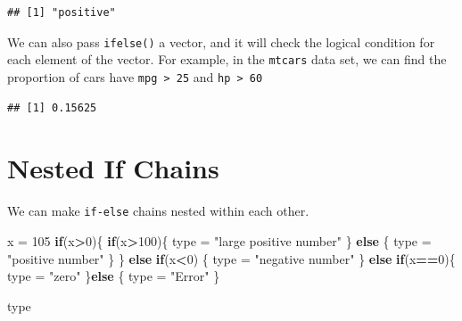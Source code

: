 \documentclass[
]{book}
\newenvironment{Shaded}{\begin{snugshade}}{\end{snugshade}}
\newcommand{\ControlFlowTok}[1]{\textcolor[rgb]{0.13,0.29,0.53}{\textbf{#1}}}
\newcommand{\DecValTok}[1]{\textcolor[rgb]{0.00,0.00,0.81}{#1}}
\newcommand{\KeywordTok}[1]{\textcolor[rgb]{0.13,0.29,0.53}{\textbf{#1}}}
\newcommand{\NormalTok}[1]{#1}
\newcommand{\OperatorTok}[1]{\textcolor[rgb]{0.81,0.36,0.00}{\textbf{#1}}}
\newcommand{\OtherTok}[1]{\textcolor[rgb]{0.56,0.35,0.01}{#1}}
\newcommand{\StringTok}[1]{\textcolor[rgb]{0.31,0.60,0.02}{#1}}
\begin{document}
\begin{verbatim}
## [1] "positive"
\end{verbatim}

We can also pass \texttt{ifelse()} a vector, and it will check the logical condition for each element of the vector. For example, in the \texttt{mtcars} data set, we can find the proportion of cars have \texttt{mpg\ \textgreater{}\ 25} and \texttt{hp\ \textgreater{}\ 60}

\begin{Shaded}
\end{Shaded}

\begin{verbatim}
## [1] 0.15625
\end{verbatim}

\hypertarget{nested-if-chains}{%
\section{Nested If Chains}\label{nested-if-chains}}

We can make \texttt{if-else} chains nested within each other.

\begin{Shaded}
\begin{Highlighting}[]
\NormalTok{x =}\StringTok{ }\DecValTok{105}
\ControlFlowTok{if}\NormalTok{(x}\OperatorTok{>}\DecValTok{0}\NormalTok{)\{}
  \ControlFlowTok{if}\NormalTok{(x}\OperatorTok{>}\DecValTok{100}\NormalTok{)\{}
\NormalTok{     type =}\StringTok{ "large positive number"}
\NormalTok{  \} }\ControlFlowTok{else}\NormalTok{ \{}
\NormalTok{     type =}\StringTok{ "positive number"}
\NormalTok{  \}}
\NormalTok{\} }\ControlFlowTok{else} \ControlFlowTok{if}\NormalTok{(x}\OperatorTok{<}\DecValTok{0}\NormalTok{) \{}
\NormalTok{  type =}\StringTok{ "negative number"}
\NormalTok{\} }\ControlFlowTok{else} \ControlFlowTok{if}\NormalTok{(x}\OperatorTok{==}\DecValTok{0}\NormalTok{)\{}
\NormalTok{  type =}\StringTok{ "zero"}
\NormalTok{\}}\ControlFlowTok{else}\NormalTok{ \{}
\NormalTok{  type =}\StringTok{ "Error"}
\NormalTok{\}}

\NormalTok{type }
\end{Highlighting}
\end{Shaded}
\end{document}
